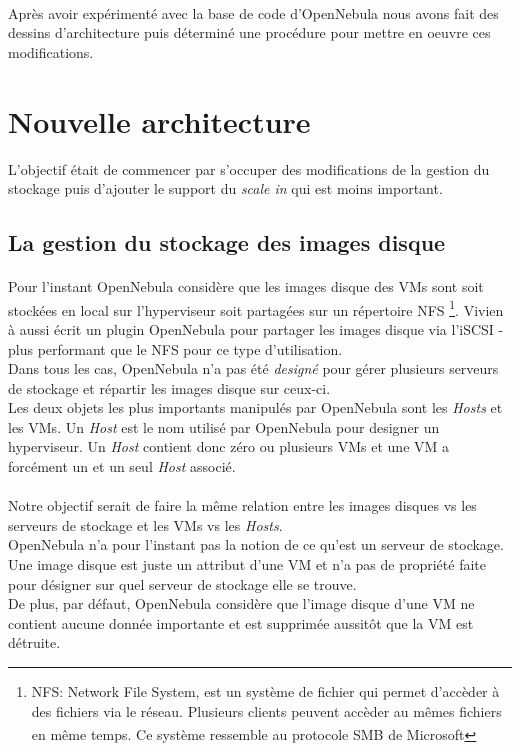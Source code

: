\paragraph*{}
Après avoir expérimenté avec la base de code d'OpenNebula nous avons fait des dessins d'architecture puis déterminé une procédure pour mettre en oeuvre ces
modifications.


\section{Nouvelle architecture}

L'objectif était de commencer par s'occuper des modifications de la gestion du stockage puis d'ajouter le support du \emph{scale in} qui est moins important.

\subsection{La gestion du stockage des images disque}
\paragraph*{}
Pour l'instant OpenNebula considère que les images disque des VMs sont soit stockées en local sur l'hyperviseur soit partagées sur un répertoire NFS
	\footnote{NFS: Network File System, est un système de fichier qui permet d'accèder à des fichiers via le réseau. Plusieurs clients peuvent accèder
	au mêmes fichiers en même temps. Ce système ressemble au protocole SMB de Microsoft\textsuperscript{\textregistered}}.
Vivien à aussi écrit un plugin OpenNebula pour partager les images disque via l'iSCSI - plus performant que le NFS pour ce type d'utilisation.
\\
Dans tous les cas, OpenNebula n'a pas été \textsl{designé} pour gérer plusieurs serveurs de stockage et répartir les images disque sur ceux-ci.
\\
Les deux objets les plus importants manipulés par OpenNebula sont les \emph{Hosts} et les VMs. Un \emph{Host} est le nom utilisé par OpenNebula pour
designer un hyperviseur.
Un \emph{Host} contient donc zéro ou plusieurs VMs et une VM a forcément un et un seul \emph{Host} associé.


\paragraph*{}
Notre objectif serait de faire la même relation entre les images disques vs les serveurs de stockage et les VMs vs les \emph{Hosts}.
\\
OpenNebula n'a pour l'instant pas la notion de ce qu'est un serveur de stockage. Une image disque est juste un attribut d'une VM et n'a
pas de propriété faite pour désigner sur quel serveur de stockage elle se trouve.\\
De plus, par défaut, OpenNebula considère que l'image disque d'une VM ne contient aucune donnée importante et est supprimée aussitôt
que la VM est détruite.

